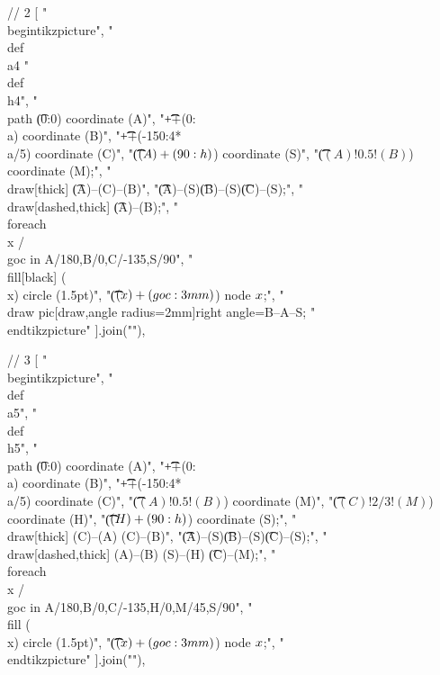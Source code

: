 // 2
[
"\\begin{tikzpicture}",
"\t\\def\\a{4} %
"\t\\def\\h{4}",
"\t\\path \t(0:0) coordinate (A)",
"\t\t\t++(0:\\a) coordinate (B)",
"\t\t\t++(-150:4*\\a/5) coordinate (C)",
"\t\t\t($(A)+(90:\\h)$) coordinate (S)",
"\t\t\t($(A)!0.5!(B)$) coordinate (M);",
"\t\\draw[thick] \t(A)--(C)--(B)",
"\t\t(A)--(S)\t(B)--(S)\t(C)--(S);",
"\t\\draw[dashed,thick] \t(A)--(B);",
"\t\\foreach \\x /\\goc in {A/180,B/0,C/-135,S/90}",
"\t\t\t\\fill[black] (\\x) circle (1.5pt)",
"\t\t\t($(\\x)+(\\goc:3mm)$) node {$\\x$};",
"\t\\draw pic[draw,angle radius=2mm]{right angle=B--A--S};%
"\\end{tikzpicture}"
].join("\n"),

// 3
[
"\\begin{tikzpicture}",
"\t\\def\\a{5}",
"\t\\def\\h{5}",
"\t\\path \t(0:0) coordinate (A)",
"\t\t\t++(0:\\a) coordinate (B)",
"\t\t\t++(-150:4*\\a/5) coordinate (C)",
"\t\t\t($(A)!0.5!(B)$) coordinate (M)",
"\t\t\t($(C)!2/3!(M)$) coordinate (H)",
"\t\t\t($(H)+(90:\\h)$) coordinate (S);",
"\t\\draw[thick] (C)--(A) (C)--(B)",
"\t\t(A)--(S)\t(B)--(S)\t(C)--(S);",
"\t\\draw[dashed,thick] (A)--(B) (S)--(H) \t(C)--(M);",
"\t\\foreach \\x / \\goc in {A/180,B/0,C/-135,H/0,M/45,S/90}",
"\t\t\t\\fill (\\x) circle (1.5pt)",
"\t\t\t($(\\x)+(\\goc:3mm)$) node {$\\x$};",
"\\end{tikzpicture}"
].join("\n"),

